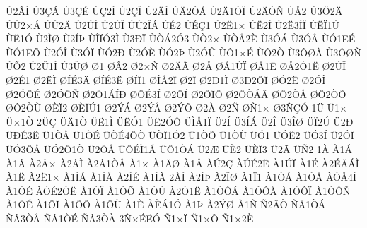 {^^d92^^c2^^cc
^^d93^^c7^^c1
^^d93^^c7^^c9
^^d9^^c72^^cc
^^d92^^c7^^ce
^^d92^^c4^^cc
^^d9^^c42^^d2^^c5
^^d92^^c41^^d2^^cf
^^d92^^c4^^d2^^d1
^^d9^^c52
^^d93^^d62^^c4
^^d9^^da2^^d7^^c1
^^d9^^da2^^c4
^^d92^^da^^cc
^^d92^^da^^ce
^^d9^^da2^^ce^^c1
^^d9^^c92
^^d9^^c9^^c71
^^d92^^cb1^^d7
^^d9^^cb2^^cc
^^d92^^cb3^^cc^^cf
^^d9^^cb^^cf1^^da
^^d9^^cb1^^d3
^^d92^^cc^^d8
^^d92^^cd^^de
^^d9^^ce^^cf^^d33^^cc
^^d93^^d0^^cf
^^d9^^d2^^c12^^d33
^^d9^^d22^^d7
^^d9^^d2^^c52^^c8
^^d93^^d3^^c1
^^d93^^d3^^c5
^^d9^^d31^^cb^^c9
^^d9^^d31^^cb^^d5
^^d92^^d3^^ce
^^d93^^d3^^cf
^^d9^^d32^^d0
^^d92^^d3^^c8
^^d9^^d32^^de
^^d92^^d3^^db
^^d9^^d41^^d7^^c9
^^d9^^d42^^d2
^^d93^^d4^^d8^^c0
^^d93^^d4^^d8^^d1
^^d9^^d52
^^d92^^db1^^cc
^^d93^^db^^d8
^^d81
^^d8^^c22
^^d82^^d7^^d1
^^d82^^c4^^c3
^^d82^^c5
^^d8^^c51^^da^^cf
^^d8^^c51^^cb
^^d8^^c52^^d31^^cb
^^d82^^da^^ce
^^d82^^c91
^^d82^^cb^^cc
^^d8^^cd^^c93^^c4
^^d8^^cd^^c93^^cb
^^d8^^cd^^cf1
^^d8^^ce^^c52^^cf
^^d82^^cf
^^d82^^d01^^cc
^^d83^^d02^^d4^^cf
^^d8^^d32^^cb
^^d82^^d3^^ce
^^d82^^d3^^d4^^c9
^^d82^^d3^^d4^^d1
^^d82^^d41^^c1^^cd^^d0
^^d8^^d4^^c93^^cd
^^d82^^d4^^cd
^^d82^^d4^^cf^^d4
^^d82^^d4^^d2^^c1^^c2
^^d8^^d42^^d2^^c5
^^d8^^d42^^d2^^d5
^^d8^^d42^^d2^^d9
^^d8^^c8^^cf2
^^d8^^c8^^cf^^da1
^^d82^^dd^^c1
^^d82^^dd^^c5
^^d82^^dd^^d5
^^d82^^c0
^^d82^^d1
^^d8^^d11^^d7
^^d83^^d1^^c7^^d3
1^^dc
^^dc1^^d7
^^dc^^d71^^d2
2^^dc^^c7
^^dc^^c41^^d2
^^dc^^cb1^^cc
^^dc^^cb^^d31
^^dc^^cb2^^d3^^d4
^^dc^^cc^^c51^^cf
^^dc2^^cd
^^dc3^^cd^^c1
^^dc2^^ce
^^dc3^^ce^^d8
^^dc^^cf2^^da
^^dc2^^d0
^^dc^^d0^^c93^^cb
^^dc1^^d2^^c5
^^dc1^^d2^^c9
^^dc^^d2^^c94^^d4^^d2
^^dc^^d2^^cf1^^d32
^^dc1^^d2^^d5
^^dc1^^d2^^d9
^^dc^^d31
^^dc^^d3^^cb2
^^dc^^d33^^cd
^^dc2^^d3^^cf
^^dc^^d33^^d4^^c5
^^dc^^d32^^d41^^d2
^^dc2^^d4^^c5
^^dc^^d4^^c9^^cc1^^c1
^^dc^^d41^^d2^^c1
^^dc2^^c6
^^dc^^c82
^^dc^^c8^^cf3
^^dc2^^c3
^^dc^^d12
1^^c0
^^c01^^c1
^^c01^^c2
^^c02^^c2^^d7
^^c02^^c2^^cc
^^c02^^c21^^d2^^c5
^^c01^^d7
^^c01^^c4^^d8
^^c01^^c5
^^c0^^da2^^c7
^^c0^^da^^c92^^cb
^^c01^^da^^cf
^^c01^^c9
^^c02^^c9^^c4^^c1^^cc
^^c01^^cb
^^c02^^cb1^^d7
^^c01^^cc^^c1
^^c01^^cc^^c5
^^c02^^cc^^c9
^^c01^^cc^^c0
2^^c0^^cd
^^c02^^cd^^de
^^c02^^ce^^d8
^^c01^^cf1
^^c01^^d2^^c1
^^c01^^d2^^c5
^^c0^^d2^^c54^^cd
^^c01^^d2^^c9
^^c0^^d2^^c92^^d3^^cb
^^c01^^d2^^cf
^^c01^^d2^^d5
^^c01^^d2^^d9
^^c02^^d31^^cb
^^c01^^d3^^d4^^c1
^^c01^^d3^^d4^^c5
^^c01^^d3^^d4^^cf
^^c01^^d3^^d4^^d1
^^c01^^d4^^c9
^^c01^^d4^^cf
^^c01^^d4^^d5
^^c01^^d4^^d9
^^c01^^c8
^^c0^^c8^^c11^^d3
^^c01^^de
^^c02^^dd^^d8
^^c01^^d1
^^d12^^c2^^d2
^^d1^^c21^^d2^^c1
^^d1^^c23^^d2^^c5
^^d1^^c21^^d2^^c9
^^d1^^c23^^d2^^c0
3^^d1^^d7^^c9^^cb^^d3
^^d11^^d7^^cf
^^d11^^d7^^d5
^^d11^^d72^^c8
}
